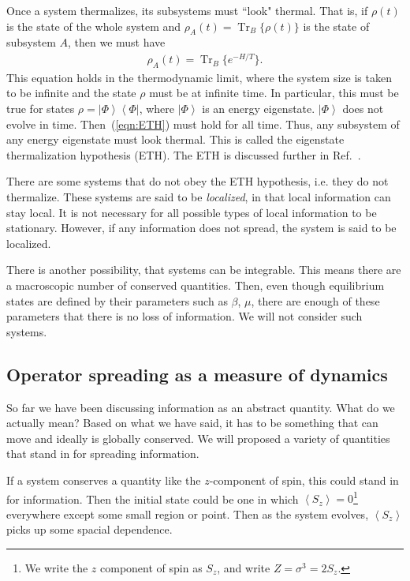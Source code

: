 \documentclass[a4paper,12pt]{article}
\newcommand{\ex}[1]{\left\langle #1 \right\rangle}
\newcommand{\ket}[1]{\left|#1\right\rangle}
\newcommand{\bra}[1]{\left\langle#1\right|}
\DeclareMathOperator{\Tr}{Tr}
\begin{document}
Once a system thermalizes, its subsystems must ``look" thermal. That is, if $\rho(t)$ is the state of the whole system and $\rho_A(t)=\Tr_B\{\rho(t)\}$ is the state of subsystem $A$, then we must have
\begin{align}
\rho_A(t) = \Tr_B\{e^{-H/T}\}. \label{eqn:ETH}
\end{align}
This equation holds in the thermodynamic limit, where the system size is taken to be infinite and the state $\rho$ must be at infinite time. In particular, this must be true for states $\rho=\ket{\Phi}\bra{\Phi}$, where $\ket{\Phi}$ is an energy eigenstate. $\ket{\Phi}$ does not evolve in time. Then~(\ref{eqn:ETH}) must hold for all time. Thus, any subsystem of any energy eigenstate must look thermal. This is called the eigenstate thermalization hypothesis (ETH). The ETH is discussed further in Ref.~\cite{Nandkishore14}.

There are some systems that do not obey the ETH hypothesis, i.e. they do not thermalize. These systems are said to be \emph{localized}, in that local information can stay local. It is not necessary for all possible types of local information to be stationary. However, if any information does not spread, the system is said to be localized.

There is another possibility, that systems can be integrable. This means there are a macroscopic number of conserved quantities. Then, even though equilibrium states are defined by their parameters such as $\beta$, $\mu$, there are enough of these parameters that there is no loss of information. We will not consider such systems.

\subsection{Operator spreading as a measure of dynamics} \label{sub:opsp}

So far we have been discussing information as an abstract quantity. What do we actually mean? Based on what we have said, it has to be something that can move and ideally is globally conserved. We will proposed a variety of quantities that stand in for spreading information.

If a system conserves a quantity like the $z$-component of spin, this could stand in for information. Then the initial state could be one in which $\ex{S_z} = 0$\footnote{We write the $z$ component of spin as $S_z$, and write $Z=\sigma^3=2S_z$.} everywhere except some small region or point. Then as the system evolves, $\ex{S_z}$ picks up some spacial dependence. 
\end{document}
